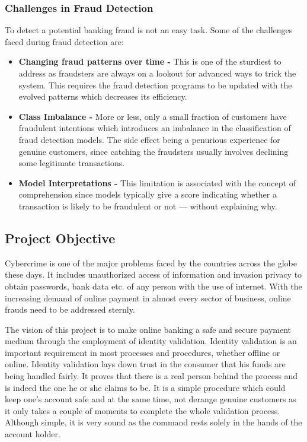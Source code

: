 \documentclass[12pt, oneside, a4paper]{article}
\begin{document}
\subsubsection{Challenges in Fraud Detection}
To detect a potential banking fraud is not an easy task. Some of the challenges faced during fraud detection are:
\begin{itemize}
    \item \textbf{Changing fraud patterns over time - }This is one of the sturdiest to address as fraudsters are always on a lookout for advanced ways to trick the system. This requires the fraud detection programs to be updated with the evolved patterns which decreases its efficiency.
    \item \textbf{Class Imbalance - }More or less, only a small fraction of customers have fraudulent intentions which introduces an imbalance in the classification of fraud detection models. The side effect being a penurious experience for genuine customers, since catching the fraudsters usually involves declining some legitimate transactions.
    \item \textbf{Model Interpretations - }This limitation is associated with the concept of comprehension since models typically give a score indicating whether a transaction is likely to be fraudulent or not — without explaining why.
\end{itemize}
\pagebreak
\subsection{Project Objective}
Cybercrime is one of the major problems faced by the countries across the globe these days. It includes unauthorized access of information and invasion privacy to obtain passwords, bank data etc. of any person with the use of internet. With the increasing demand of online payment in almost every sector of business, online frauds need to be addressed sternly. 

The vision of this project is to make online banking a safe and secure payment medium through the employment of identity validation. Identity validation is an important requirement in most processes and procedures, whether offline or online. Identity validation lays down trust in the consumer that his funds are being handled fairly. It proves that there is a real person behind the process and is indeed the one he or she claims to be. It is a simple procedure which could keep one's account safe and at the same time, not derange genuine customers as it only takes a couple of moments to complete the whole validation process. Although simple, it is very sound as the command rests solely in the hands of the account holder.
\end{document}

